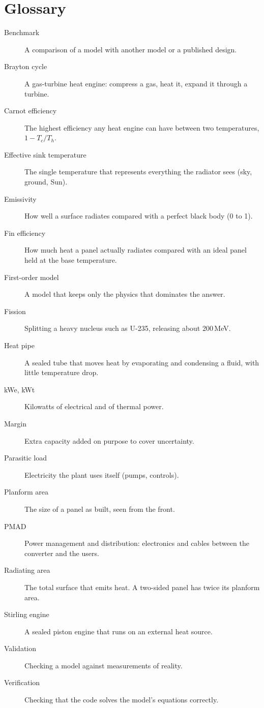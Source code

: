 \documentclass[11pt]{article}
\numberwithin{equation}{section}
\numberwithin{table}{section}
\begin{document}
\section{Glossary}\label{app:glossary}
\begin{description}
  \item[Benchmark] A comparison of a model with another model or a published design.
  \item[Brayton cycle] A gas-turbine heat engine: compress a gas, heat it, expand it
        through a turbine.
  \item[Carnot efficiency] The highest efficiency any heat engine can have between two
        temperatures, $1-T_c/T_h$.
  \item[Effective sink temperature] The single temperature that represents everything
        the radiator sees (sky, ground, Sun).
  \item[Emissivity] How well a surface radiates compared with a perfect black body
        (0 to 1).
  \item[Fin efficiency] How much heat a panel actually radiates compared with an ideal
        panel held at the base temperature.
  \item[First-order model] A model that keeps only the physics that dominates the answer.
  \item[Fission] Splitting a heavy nucleus such as U-235, releasing about 200\,MeV.
  \item[Heat pipe] A sealed tube that moves heat by evaporating and condensing a fluid,
        with little temperature drop.
  \item[kWe, kWt] Kilowatts of electrical and of thermal power.
  \item[Margin] Extra capacity added on purpose to cover uncertainty.
  \item[Parasitic load] Electricity the plant uses itself (pumps, controls).
  \item[Planform area] The size of a panel as built, seen from the front.
  \item[PMAD] Power management and distribution: electronics and cables between the
        converter and the users.
  \item[Radiating area] The total surface that emits heat. A two-sided panel has twice
        its planform area.
  \item[Stirling engine] A sealed piston engine that runs on an external heat source.
  \item[Validation] Checking a model against measurements of reality.
  \item[Verification] Checking that the code solves the model's equations correctly.
\end{description}
\end{document}
